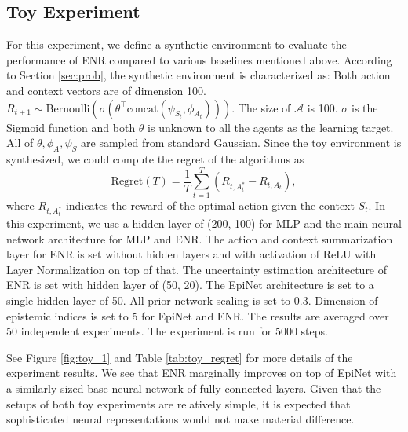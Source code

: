 \subsection{Toy Experiment}
For this experiment, we define a synthetic environment to evaluate the performance of ENR compared to various baselines mentioned above. According to Section \ref{sec:prob}, the synthetic environment is characterized as: Both action and context vectors are of dimension 100. $R_{t+1} \sim \text{Bernoulli}\left(\sigma(\theta^\top\text{concat}(\psi_{S_t}, \phi_{A_t}))\right)$. The size of $\mathcal{A}$ is 100. $\sigma$ is the Sigmoid function and both $\theta$ is unknown to all the agents as the learning target. All of $\theta, \phi_A, \psi_S$ are sampled from standard Gaussian. Since the toy environment is synthesized, we could compute the regret of the algorithms as
\begin{equation}
    \text{Regret}(T) = \frac{1}{T}\sum_{t=1}^T (R_{t, A^*_t} - R_{t, A_t}),
\end{equation}
where $R_{t, A^*_t}$ indicates the reward of the optimal action given the context $S_t$. In this experiment, we use a hidden layer of (200, 100) for MLP and the main neural network architecture for MLP and ENR. The action and context summarization layer for ENR is set without hidden layers and with activation of ReLU with Layer Normalization on top of that. The uncertainty estimation architecture of ENR is set with hidden layer of (50, 20). The EpiNet architecture is set to a single hidden layer of 50. All prior network scaling is set to 0.3. Dimension of epistemic indices is set to 5 for EpiNet and ENR. The results are averaged over 50 independent experiments. The experiment is run for 5000 steps.

See Figure \ref{fig:toy_1} and Table \ref{tab:toy_regret} for more details of the experiment results. We see that ENR marginally improves on top of EpiNet with a similarly sized base neural network of fully connected layers. Given that the setups of both toy experiments are relatively simple, it is expected that sophisticated neural representations would not make material difference.  

